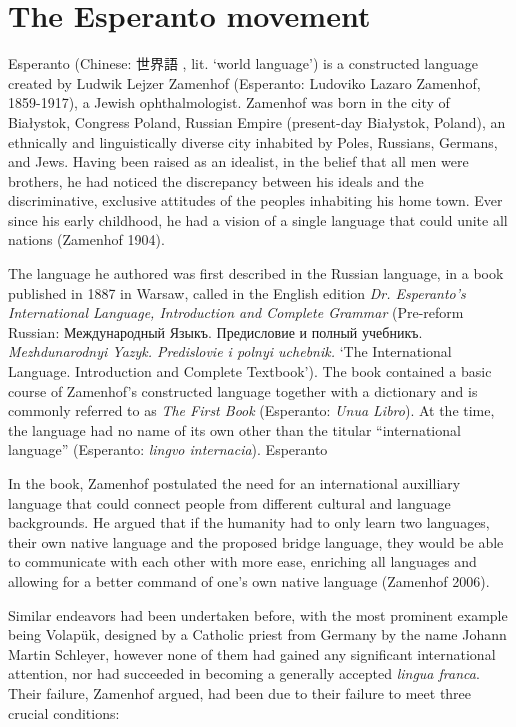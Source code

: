 \section{The Esperanto movement}

Esperanto (Chinese: 世界語 , lit. `world language') is a constructed language created by Ludwik Lejzer Zamenhof (Esperanto: Ludoviko Lazaro Zamenhof, 1859-1917), a Jewish ophthalmologist.
Zamenhof was born in the city of Białystok, Congress Poland, Russian Empire (present-day Białystok, Poland), an ethnically and linguistically diverse city inhabited by Poles, Russians, Germans, and Jews.
Having been raised as an idealist, in the belief that all men were brothers, he had noticed the discrepancy between his ideals and the discriminative, exclusive attitudes of the peoples inhabiting his home town.
Ever since his early childhood, he had a vision of a single language that could unite all nations (Zamenhof 1904).

The language he authored was first described in the Russian language, in a book published in 1887 in Warsaw, called in the English edition \textit{Dr. Esperanto's International Language, Introduction and Complete Grammar} (Pre-reform Russian: Между\-на\-род\-ный Языкъ. Предисловие и полный учебникъ. \textit{Mezhdunarodnyi Yazyk. Predislovie i polnyi uchebnik.} `The International Language. Introduction and Complete Textbook').
The book contained a basic course of Zamenhof's constructed language together with a dictionary and is commonly referred to as \textit{The First Book} (Esperanto: \textit{Unua Libro}).
At the time, the language had no name of its own other than the titular ``international language'' (Esperanto: \textit{lingvo internacia}).
Esperanto

In the book, Zamenhof postulated the need for an international auxilliary language that could connect people from different cultural and language backgrounds.
He argued that if the humanity had to only learn two languages, their own native language and the proposed bridge language, they would be able to communicate with each other with more ease, enriching all languages and allowing for a better command of one's own native language (Zamenhof 2006).

Similar endeavors had been undertaken before, with the most prominent example being Volapük, designed by a Catholic priest from Germany by the name Johann Martin Schleyer, however none of them had gained any significant international attention, nor had succeeded in becoming a generally accepted \textit{lingua franca}.
Their failure, Zamenhof argued, had been due to their failure to meet three crucial conditions:

